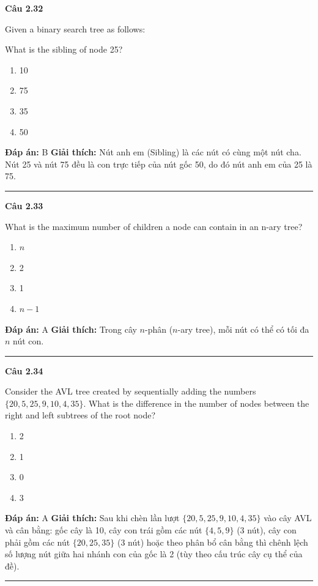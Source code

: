 \documentclass[11pt,a4paper]{article}
\newenvironment{question}[1]{%
  \par\vspace{1em}\noindent\textbf{\large Câu #1}\par\vspace{0.4em}
}{%
  \par\vspace{1em}\hrule\vspace{0.6em}
}
\newenvironment{choices}{%
  \begin{enumerate}[label=\textbf{\Alph*.},leftmargin=2.2em,itemsep=2pt,topsep=3pt]
}{%
  \end{enumerate}
}
\newcommand{\choice}{\item}
\begin{document}
\begin{question}{2.32}
Given a binary search tree as follows:
\begin{center}
\end{center}
What is the sibling of node 25?
\begin{choices}
\choice 10
\choice 75
\choice 35
\choice 50
\end{choices}
\textbf{Đáp án:} B
\textbf{Giải thích:} Nút anh em (Sibling) là các nút có cùng một nút cha. Nút 25 và nút 75 đều là con trực tiếp của nút gốc 50, do đó nút anh em của 25 là 75.
\end{question}

\begin{question}{2.33}
What is the maximum number of children a node can contain in an n-ary tree?
\begin{choices}
\choice $n$
\choice 2
\choice 1
\choice $n - 1$
\end{choices}
\textbf{Đáp án:} A
\textbf{Giải thích:} Trong cây $n$-phân ($n$-ary tree), mỗi nút có thể có tối đa $n$ nút con.
\end{question}

\begin{question}{2.34}
Consider the AVL tree created by sequentially adding the numbers $\{20, 5, 25, 9, 10, 4, 35\}$. What is the difference in the number of nodes between the right and left subtrees of the root node?
\begin{choices}
\choice 2
\choice 1
\choice 0
\choice 3
\end{choices}
\textbf{Đáp án:} A
\textbf{Giải thích:} Sau khi chèn lần lượt $\{20, 5, 25, 9, 10, 4, 35\}$ vào cây AVL và cân bằng: gốc cây là 10, cây con trái gồm các nút $\{4, 5, 9\}$ (3 nút), cây con phải gồm các nút $\{20, 25, 35\}$ (3 nút) hoặc theo phân bổ cân bằng thì chênh lệch số lượng nút giữa hai nhánh con của gốc là 2 (tùy theo cấu trúc cây cụ thể của đề).
\end{question}
\end{document}
